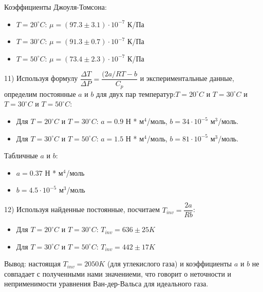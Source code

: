 \documentclass[12pt,a4paper]{article}
\begin{document}
	Коэффициенты Джоуля-Томсона:
	\begin{itemize}
		\item $T = 20^\circ C$: $\mu = (97.3 \pm 3.1) \cdot 10^{-7}$ К/Па
		\item $T = 30^\circ C$: $\mu = (91.3 \pm 0.7) \cdot 10^{-7}$ К/Па
		\item $T = 50^\circ C$: $\mu = (73.4 \pm 2.3) \cdot 10^{-7}$ К/Па
	\end{itemize}
	11) Используя формулу $\dfrac{\Delta T}{\Delta P} = \dfrac{(2a/RT - b}{C_p}$ и экспериментальные данные, определим постоянные $a$ и $b$ для двух пар температур:$T = 20^{\circ}C$ и $T = 30^{\circ}C$ и $T = 30^{\circ}C$ и $T = 50^{\circ}C$:
	\begin{itemize}
		\item Для $T = 20^{\circ}C$ и $T = 30^{\circ}C$: $a = 0.9$ Н * м$^4$/моль, $b = 34 \cdot 10^{-5}$ м$^3$/моль.
		\item Для $T = 30^{\circ}C$ и $T = 50^{\circ}C$: $a = 1.5$ Н * м$^4$/моль, $b = 81 \cdot 10^{-5}$ м$^3$/моль.
	\end{itemize}
	Табличные $a$ и $b$:
	\begin{itemize}
		\item $a = 0.37$ Н * м$^4$/моль
		\item $b = 4.5 \cdot 10^{-5}$ м$^3$/моль 
	\end{itemize}
	12) Используя найденные постоянные, посчитаем $T_{inv} = \dfrac{2a}{Rb}$:
	\begin{itemize}
		\item Для $T = 20^{\circ}C$ и $T = 30^{\circ}C$: $T_{inv} = 636 \pm 25K$
		\item Для $T = 30^{\circ}C$ и $T = 50^{\circ}C$: $T_{inv} = 442 \pm 17K$
	\end{itemize}
	Вывод: настоящая $T_{inv} = 2050 K$ (для углекислого газа) и коэффициенты $a$ и $b$ не совпадает с полученными нами значениеми, что говорит о неточности и неприменимости уравнения Ван-дер-Вальса для идеального газа.
\end{document}
